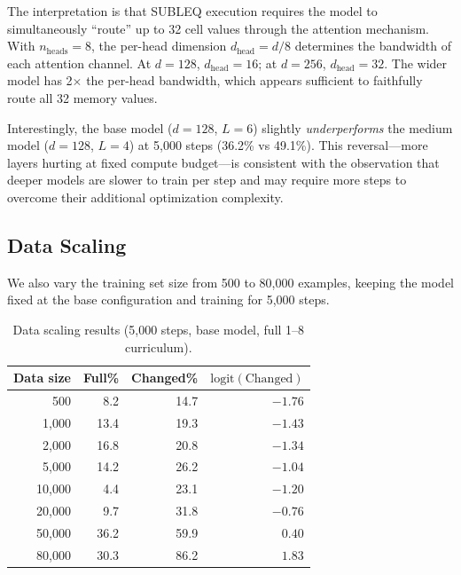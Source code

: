 \documentclass[11pt,a4paper]{article}
\begin{document}
The interpretation is that SUBLEQ execution requires the model to simultaneously ``route'' up to 32 cell values through the attention mechanism.
With $n_\text{heads} = 8$, the per-head dimension $d_\text{head} = d / 8$ determines the bandwidth of each attention channel.
At $d = 128$, $d_\text{head} = 16$; at $d = 256$, $d_\text{head} = 32$.
The wider model has 2$\times$ the per-head bandwidth, which appears sufficient to faithfully route all 32 memory values.

Interestingly, the base model ($d{=}128$, $L{=}6$) slightly \emph{underperforms} the medium model ($d{=}128$, $L{=}4$) at 5{,}000 steps (36.2\% vs 49.1\%).
This reversal---more layers hurting at fixed compute budget---is consistent with the observation that deeper models are slower to train per step and may require more steps to overcome their additional optimization complexity.

\subsection{Data Scaling}

We also vary the training set size from 500 to 80{,}000 examples, keeping the model fixed at the base configuration and training for 5{,}000 steps.

\begin{table}[h]
\centering
\caption{Data scaling results (5{,}000 steps, base model, full 1--8 curriculum).}
\label{tab:data_scaling}
\begin{tabular}{rrrr}
\toprule
\textbf{Data size} & \textbf{Full\%} & \textbf{Changed\%} & $\mathrm{logit}(\text{Changed})$ \\
\midrule
500 & 8.2 & 14.7 & $-1.76$ \\
1{,}000 & 13.4 & 19.3 & $-1.43$ \\
2{,}000 & 16.8 & 20.8 & $-1.34$ \\
5{,}000 & 14.2 & 26.2 & $-1.04$ \\
10{,}000 & 4.4 & 23.1 & $-1.20$ \\
20{,}000 & 9.7 & 31.8 & $-0.76$ \\
50{,}000 & 36.2 & 59.9 & $0.40$ \\
80{,}000 & 30.3 & 86.2 & $1.83$ \\
\bottomrule
\end{tabular}
\end{table}
\end{document}
